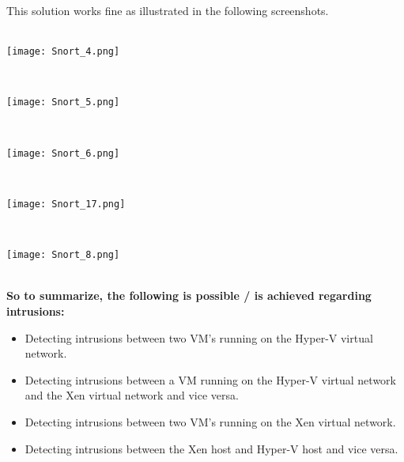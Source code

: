 This solution works fine as illustrated in the following screenshots.
$\;$ \\ \\
\noindent\begin{minipage}{\textwidth}
    \centering
    \texttt{[image: Snort\_4.png]}
\label{fig:network}
\end{minipage}
$\;$ \\ \\
\noindent\begin{minipage}{\textwidth}
    \centering
    \texttt{[image: Snort\_5.png]}
\label{fig:network}
\end{minipage}
$\;$ \\ \\
\noindent\begin{minipage}{\textwidth}
    \centering
    \texttt{[image: Snort\_6.png]}
\label{fig:network}
\end{minipage}
$\;$ \\ \\
\noindent\begin{minipage}{\textwidth}
    \centering
    \texttt{[image: Snort\_17.png]}
\label{fig:network}
\end{minipage}
$\;$ \\ \\
\noindent\begin{minipage}{\textwidth}
    \centering
    \texttt{[image: Snort\_8.png]}
\label{fig:network}
\end{minipage}
$\;$ \\ \\
\textbf{So to summarize, the following is possible / is achieved regarding intrusions:}
\begin{itemize}
\item Detecting intrusions between two VM's running on the Hyper-V virtual network.
\item Detecting intrusions between a VM running on the Hyper-V virtual network and the Xen virtual network and vice versa.
\item Detecting intrusions between two VM's running on the Xen virtual network.
\item Detecting intrusions between the Xen host and Hyper-V host and vice versa.
\end{itemize}

